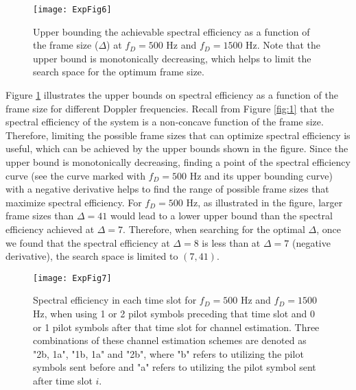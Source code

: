 \documentclass[conference, a4paper, 10pt]{IEEEtran}
\begin{document}
\begin{figure}[t]
\begin{center}
\texttt{[image: ExpFig6]}
\caption{
Upper bounding the achievable spectral efficiency as a function of the frame size ($\Delta$)
at $f_D=500$ Hz and $f_D=1500$ Hz. Note that the upper bound is monotonically decreasing, which
helps to limit the search space for the optimum frame size.
}
\label{fig:6}
\end{center}
\end{figure}

Figure \ref{fig:6} illustrates the upper bounds on spectral efficiency as a function of the
frame size for different Doppler frequencies. Recall from Figure \ref{fig:1} that the spectral
efficiency of the system is a non-concave function of the frame size. Therefore, limiting the
possible frame sizes that can optimize spectral efficiency is useful, which can be achieved
by the upper bounds shown in the figure. Since the upper bound is monotonically decreasing,
finding a point of the spectral efficiency curve (see the curve marked with $f_D=500$ Hz
and its upper bounding curve) with a negative derivative helps to find the range of possible
frame sizes that maximize spectral efficiency. For $f_D=500$ Hz, as illustrated in the figure,
larger frame sizes than $\Delta=41$ would lead to a lower upper bound
than the spectral efficiency achieved at $\Delta=7$.
Therefore, when searching for the optimal $\Delta$, once we found that the spectral efficiency
at $\Delta=8$ is less than at $\Delta=7$ (negative derivative), the search space is limited to $(7,41)$.

\begin{figure}[t]
\begin{center}
\texttt{[image: ExpFig7]}
\caption{
Spectral efficiency in each time slot for $f_D=500$ Hz and $f_D=1500$ Hz, when using
1 or 2 pilot symbols preceding that time slot and 0 or 1 pilot symbols after that
time slot for channel estimation. Three combinations of these channel estimation schemes
are denoted as "2b, 1a", "1b, 1a" and "2b", where "b" refers to utilizing the pilot symbols
sent before and "a" refers to utilizing the pilot symbol sent after time slot $i$.
}
\label{fig:7}
\end{center}
\end{figure}
\end{document}
